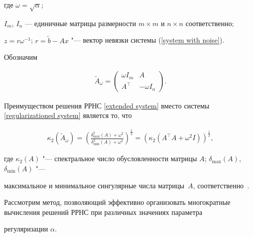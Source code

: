 где $\omega = \sqrt{\alpha}$; 

$I_m$, $I_n$ --- единичные матрицы размерности $m \times m$ и $n \times n$  соответственно; 

$z = r{\omega}^{-1}$; $r = \widetilde{b} - Ax$ "--- вектор невязки системы (\ref{system with noise}).

Обозначим

\begin{gather*}

\label{extended matrix} \widetilde{A}_\omega = \left(

\begin{array}{cc}

{\omega I_m} & A \\ A^\top    & {-\omega I_n}

\end{array}

\right).

\end{gather*}



Преимуществом решения РРНС \eqref{extended system} вместо системы \eqref{regularizationed system} является то, что

\begin{gather*}

\kappa_2(\widetilde{A}_\omega) = \left( \frac{{\delta}^2_{\max}(A) +

{\omega}^2}{{\delta}^2_{\min}(A) + {\omega}^2} \right)^{\frac{1}{2}}

= \left(\kappa_2(A^\top   A+\omega^2 I)\right)^{\frac{1}{2}},

\end{gather*}

где $\kappa_2(A)$ "--- спектральное число обусловленности матрицы $A$; ${\delta}_{\max}(A)$, \linebreak ${\delta}_{\min}(A)$ "--- 

максимальное и минимальное сингулярные числа матрицы~$A$, соответственно~{\cite{dolishzhdanov:bib:zhdanov}}.



Рассмотрим метод, позволяющий эффективно организовать многократные вычисления решений РРНС при различных значениях параметра

регуляризации $\alpha$.



\smallskip





